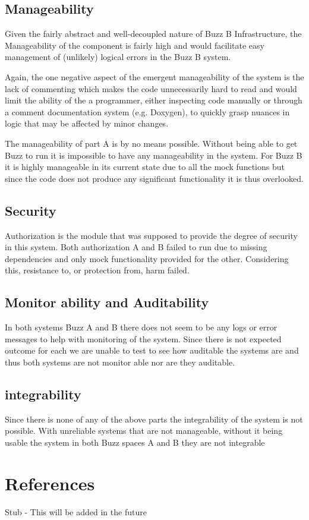 \documentclass[12pt]{article}
\begin{document}
\subsection{Manageability}
Given the fairly abstract and well-decoupled nature of Buzz B Infrastructure, the Manageability of the component is fairly high and would facilitate easy management of (unlikely) logical errors in the Buzz B system. 

Again, the one negative aspect of the emergent manageability of the system is the lack of commenting which makes the code unnecessarily hard to read and would limit the ability of the a programmer, either inspecting code manually or through a comment documentation system (e.g. Doxygen), to quickly grasp nuances in logic that may be affected by minor changes.

The manageability of part A is by no means possible. Without being able to get Buzz to run it is impossible to have any manageability in the system. For Buzz B it is highly manageable in its current state due to all the mock functions but since the code does not produce any significant functionality it is thus overlooked.
\subsection{Security}
Authorization is the module that was supposed to provide the degree of security in this system. Both authorization A and B  failed to run due to missing dependencies and only mock functionality provided for the other. Considering this, resistance to, or protection from, harm failed.
\subsection{Monitor ability and Auditability}
In both systems Buzz A and B there does not seem to be any logs or error messages to help with monitoring of the system. Since there is not expected outcome for each we are unable to test to see how auditable the systems are and thus both systems are not monitor able nor are they auditable.
\subsection{integrability}
Since there is none of any of the above parts the integrability of the system is not possible. With unreliable systems that are not manageable, without it being usable the system in both Buzz spaces A and B they are not integrable

\section{References}
Stub - This will be added in the future
\end{document}
